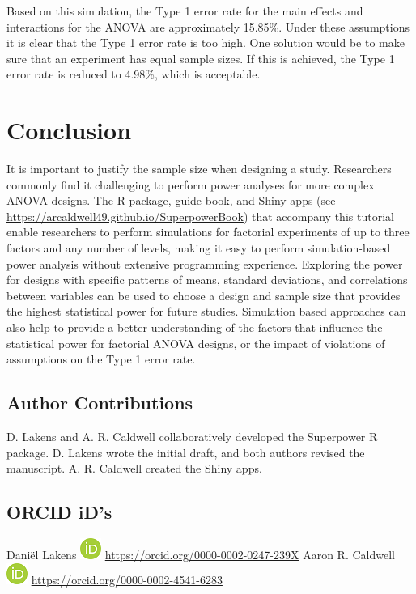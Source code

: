 \documentclass[
  ,jou,floatsintext]{apa6}
\begin{document}
Based on this simulation, the Type 1 error rate for the main effects and interactions for the ANOVA are approximately 15.85\%.
Under these assumptions it is clear that the Type 1 error rate is too high.
One solution would be to make sure that an experiment has equal sample sizes.
If this is achieved, the Type 1 error rate is reduced to 4.98\%, which is acceptable.

\hypertarget{conclusion}{%
\section{Conclusion}\label{conclusion}}

It is important to justify the sample size when designing a study.
Researchers commonly find it challenging to perform power analyses for more complex ANOVA designs.
The R package, guide book, and Shiny apps (see \url{https://arcaldwell49.github.io/SuperpowerBook}) that accompany this tutorial enable researchers to perform simulations for factorial experiments of up to three factors and any number of levels, making it easy to perform simulation-based power analysis without extensive programming experience.
Exploring the power for designs with specific patterns of means, standard deviations, and correlations between variables can be used to choose a design and sample size that provides the highest statistical power for future studies.
Simulation based approaches can also help to provide a better understanding of the factors that influence the statistical power for factorial ANOVA designs, or the impact of violations of assumptions on the Type 1 error rate.

\hypertarget{author-contributions}{%
\subsection{Author Contributions}\label{author-contributions}}

D. Lakens and A. R. Caldwell collaboratively developed the Superpower R package. D. Lakens wrote the initial draft, and both authors revised the manuscript. A. R. Caldwell created the Shiny apps.

\hypertarget{orcid-ids}{%
\subsection{ORCID iD's}\label{orcid-ids}}

Daniël Lakens \includegraphics{screenshots/orcid.png} \url{https://orcid.org/0000-0002-0247-239X}
Aaron R. Caldwell \includegraphics{screenshots/orcid.png} \url{https://orcid.org/0000-0002-4541-6283}
\end{document}
